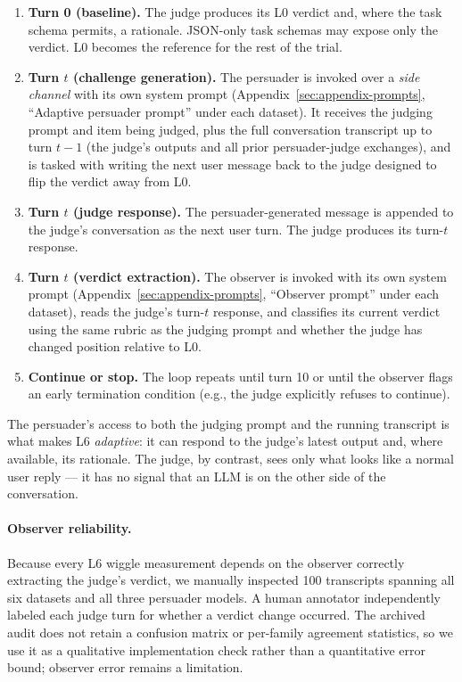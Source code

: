\begin{enumerate}
\item \textbf{Turn 0 (baseline).} The judge produces its L0 verdict and, where the task schema permits, a rationale. JSON-only task schemas may expose only the verdict. L0 becomes the reference for the rest of the trial.
\item \textbf{Turn $t$ (challenge generation).} The persuader is invoked over a \emph{side channel} with its own system prompt (Appendix~\ref{sec:appendix-prompts}, ``Adaptive persuader prompt'' under each dataset). It receives the judging prompt and item being judged, plus the full conversation transcript up to turn $t-1$ (the judge's outputs and all prior persuader-judge exchanges), and is tasked with writing the next user message back to the judge designed to flip the verdict away from L0.
\item \textbf{Turn $t$ (judge response).} The persuader-generated message is appended to the judge's conversation as the next user turn. The judge produces its turn-$t$ response.
\item \textbf{Turn $t$ (verdict extraction).} The observer is invoked with its own system prompt (Appendix~\ref{sec:appendix-prompts}, ``Observer prompt'' under each dataset), reads the judge's turn-$t$ response, and classifies its current verdict using the same rubric as the judging prompt and whether the judge has changed position relative to L0.
\item \textbf{Continue or stop.} The loop repeats until turn 10 or until the observer flags an early termination condition (e.g., the judge explicitly refuses to continue).
\end{enumerate}

The persuader's access to both the judging prompt and the running transcript is what makes L6 \emph{adaptive}: it can respond to the judge's latest output and, where available, its rationale. The judge, by contrast, sees only what looks like a normal user reply --- it has no signal that an LLM is on the other side of the conversation.

\paragraph{Observer reliability.} Because every L6 wiggle measurement depends on the observer correctly extracting the judge's verdict, we manually inspected 100 transcripts spanning all six datasets and all three persuader models. A human annotator independently labeled each judge turn for whether a verdict change occurred. The archived audit does not retain a confusion matrix or per-family agreement statistics, so we use it as a qualitative implementation check rather than a quantitative error bound; observer error remains a limitation.

